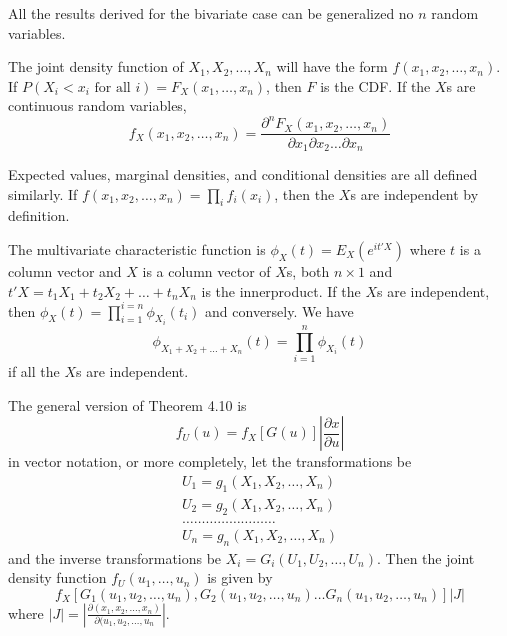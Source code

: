 \documentclass{article}
\begin{document}
All the results derived for the bivariate case can be generalized no \(n\) random variables.

The joint density function of \(X_1,X_2,\dots,X_n\) will have the form \(f(x_1,x_2,\dots,x_n)\). If \(P(X_i<x_i \text{ for all } i)=F_X(x_1,\dots,x_n)\), then \(F\) is the CDF. If the \(X\)s are continuous random variables,
\begin{equation*}    f_X(x_1,x_2,\dots,x_n)=\frac{\partial^nF_X(x_1,x_2,\dots,x_n)}{\partial x_1\partial x_2\dots \partial x_n}
\end{equation*}

Expected values, marginal densities, and conditional densities are all defined similarly. If \(f(x_1,x_2,\dots,x_n)=\prod_i f_i(x_i)\), then the \(X\)s are independent by definition.

The multivariate characteristic function is \(\phi_X(t)=E_X(e^{it'X})\) where \(t\) is a column vector and \(X\) is a column vector of \(X\)s, both \(n \times 1\) and \(t'X=t_1X_1+t_2X_2+\dots+t_nX_n\) is the innerproduct. If the \(X\)s are independent, then \(\phi_X(t)=\prod_{i=1}^{i=n} \phi_{X_i}(t_i)\) and conversely. We have
\begin{equation*}
    \phi_{X_1+X_2+\dots+X_n}(t)=\prod_{i=1}^n \phi_{X_i}(t)
\end{equation*}
if all the \(X\)s are independent.

The general version of Theorem 4.10 is
\begin{equation*}
    f_U(u)=f_X[G(u)]\left|\frac{\partial x}{\partial u} \right|
\end{equation*}
in vector notation, or more completely, let the transformations be
\begin{equation*}
    \begin{split}
        U_1=g_1(X_1,X_2,\dots,X_n) \\
        U_2=g_2(X_1,X_2,\dots,X_n) \\
        \dots \dots \dots \dots \dots \dots \dots \dots\\
        U_n=g_n(X_1,X_2,\dots,X_n)
        \end{split}
\end{equation*}
and the inverse transformations be \(X_i=G_i(U_1,U_2,\dots,U_n)\). Then the joint density function \(f_U(u_1,\dots,u_n)\) is given by 
\begin{equation*}
f_X[G_1(u_1,u_2,\dots,u_n),G_2(u_1,u_2,\dots,u_n)\dots G_n(u_1,u_2,\dots,u_n)] |J|
\end{equation*}
where \(|J|=\left|\frac{\partial(x_1,x_2,\dots,x_n)}{\partial(u_1,u_2,\dots,u_n} \right|\).
\end{document}
